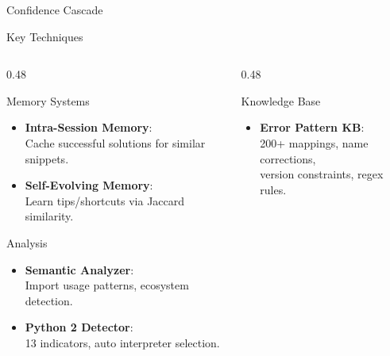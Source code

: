 \documentclass[aspectratio=169]{beamer}
\begin{document}
\begin{frame}{Confidence Cascade}
\begin{center}
\end{center}
\end{frame}

\begin{frame}{Key Techniques}
\begin{columns}[T]

\begin{column}{0.48\textwidth}
\begin{block}{\faMemory\quad Memory Systems}
\begin{itemize}\small
  \item \textbf{Intra-Session Memory}:\\
        Cache successful solutions for similar snippets.
  \item \textbf{Self-Evolving Memory}:\\
        Learn tips/shortcuts via Jaccard similarity.
\end{itemize}
\end{block}

\begin{block}{\faCogs\quad Analysis}
\begin{itemize}\small
  \item \textbf{Semantic Analyzer}:\\
        Import usage patterns, ecosystem detection.
  \item \textbf{Python 2 Detector}:\\
        13 indicators, auto interpreter selection.
\end{itemize}
\end{block}
\end{column}

\begin{column}{0.48\textwidth}
\begin{block}{\faBook\quad Knowledge Base}
\begin{itemize}\small
  \item \textbf{Error Pattern KB}:\\
        200+ mappings, name corrections,\\
        version constraints, regex rules.
\end{itemize}
\end{block}


\end{column}
\end{columns}
\end{frame}
\end{document}

